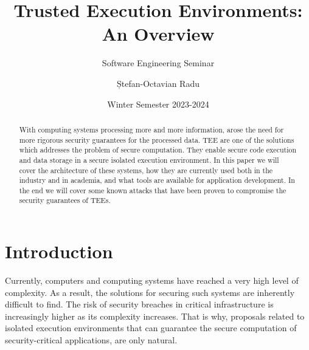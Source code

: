 \documentclass[runningheads,a4paper]{uwsese}
\begin{document}
\mainmatter 

\title{Trusted Execution Environments: An Overview}
\subtitle{Software Engineering Seminar}


\date{Winter Semester 2023-2024}


\author{Ștefan-Octavian Radu}
%


\maketitle

\begin{abstract}

    With computing systems processing more and more information, arose the need
    for more rigorous security guarantees for the processed data. \gls{TEE} are
    one of the solutions which addresses the problem of secure computation. They
    enable secure code execution and data storage in a secure isolated
    execution environment. In this paper we will cover the architecture of
    these systems, how they are currently used both in the industry and in
    academia, and what tools are available for application development. In the
    end we will cover some known attacks that have been proven to compromise
    the security guarantees of \glspl{TEE}.

\end{abstract}


\section{Introduction}

Currently, computers and computing systems have reached a very high level of
complexity. As a result, the solutions for securing such systems are inherently
difficult to find. The risk of security breaches in critical infrastructure is
increasingly higher as its complexity increases. That is why, proposals related
to isolated execution environments that can guarantee the secure computation of
security-critical applications, are only natural.
\end{document}
